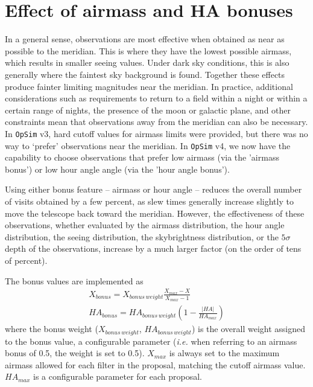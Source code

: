 \documentclass[DM,lsstdraft,authoryear,toc]{lsstdoc}
\newcommand{\opsim}{\texttt{OpSim}\xspace}
\begin{document}
\section{Effect of airmass and HA bonuses}

In a general sense, observations are most effective when obtained as near as possible to the meridian. This is where they have the lowest possible airmass, which results in smaller seeing values. Under dark sky conditions, this is also generally where the faintest sky background is found. Together these effects produce fainter limiting magnitudes near the meridian. In practice, additional considerations such as requirements to return to a field within a night or within a certain range of nights, the presence of the moon or galactic plane, and other constraints mean that observations away from the meridian can also be necessary. In \opsim v3, hard cutoff values for airmass limits were provided, but there was no way to `prefer' observations near the meridian. In \opsim v4, we now have the capability to choose observations that prefer low airmass (via the 'airmass bonus') or low hour angle angle (via the 'hour angle bonus').

Using either bonus feature -- airmass or hour angle -- reduces the overall number of visits obtained by a few percent, as slew times generally increase slightly to move the telescope back toward the meridian. However, the effectiveness of these observations, whether evaluated by the airmass distribution, the hour angle distribution, the seeing distribution, the skybrightness distribution, or the $5\sigma$ depth of the observations, increase by a much larger factor (on the order of tens of percent). 

The bonus values are implemented as
\begin{eqnarray}
X_{bonus} = X_{bonus\, weight}  \frac {X_{max} - X}{X_{max} - 1}\\
HA_{bonus} = HA_{bonus\, weight}  \left( 1 - \frac{| HA |}{HA_{max}} \right)
\end{eqnarray}
where the bonus weight ($X_{bonus\, weight}$, $HA_{bonus\, weight}$) is the overall weight assigned to the bonus value, a configurable parameter ({\it i.e.} when referring to an airmass bonus of 0.5, the weight is set to 0.5). $X_{max}$ is always set to the maximum airmass allowed for each filter in the proposal, matching the cutoff airmass value. $HA_{max}$ is a configurable parameter for each proposal.
\end{document}
